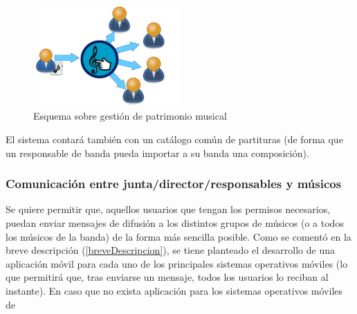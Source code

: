 \documentclass[11pt,spanish]{article}
\begin{document}
\begin{figure}[!h]
\centering
\includegraphics[width=0.5\textwidth]{img/patrimonio_musical.jpg}
\caption{Esquema sobre gestión de patrimonio musical}
\end{figure}

El sistema contará también con un catálogo común de partituras (de forma que un
responsable de banda pueda importar a su banda una composición).



\subsubsection{Comunicación entre junta/director/responsables y músicos}
Se quiere permitir que, aquellos usuarios que tengan los permisos necesarios,
puedan enviar mensajes de difusión a los distintos grupos de músicos (o a todos los
músicos de la banda) de la forma más sencilla posible.
\newline
Como se comentó en la breve descripción (\ref{breveDescripcion}), se tiene
planteado el desarrollo de una aplicación móvil para cada uno de los principales
sistemas operativos móviles (lo que permitirá que, tras enviarse un mensaje, todos
los usuarios lo reciban al instante). En caso que no exista aplicación para los sistemas
operativos móviles de
\end{document}
